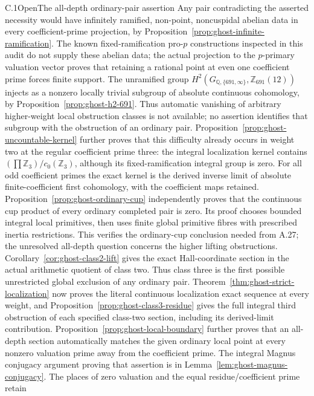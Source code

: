 \begin{result}{C.1}{Open}{The all-depth ordinary-pair assertion}
Any pair contradicting the asserted necessity would have
infinitely ramified, non-point, noncuspidal abelian data in
every coefficient-prime projection, by
Proposition~\ref{prop:ghost-infinite-ramification}. The
known fixed-ramification pro-\(p\) constructions inspected in
this audit do not supply these abelian data; the actual
projection to the \(p\)-primary valuation vector proves
that retaining a rational point at even one coefficient prime
forces finite support. The unramified group
\(H^2(G_{\mathbb Q,\{691,\infty\}},\mathbb Z_{691}(12))\)
injects as a nonzero locally trivial subgroup of absolute
continuous cohomology, by
Proposition~\ref{prop:ghost-h2-691}. Thus automatic vanishing
of arbitrary higher-weight local obstruction classes is not
available; no assertion identifies that subgroup with the
obstruction of an ordinary pair.
Proposition~\ref{prop:ghost-uncountable-kernel} further proves
that this difficulty already occurs in weight two at the
regular coefficient prime three: the integral localization
kernel contains \((\prod\mathbb Z_3)/c_0(\mathbb Z_3)\),
although its fixed-ramification integral group is zero.
For all odd coefficient primes the exact kernel is the
derived inverse limit of absolute finite-coefficient
first cohomology, with the coefficient maps retained.
Proposition~\ref{prop:ghost-ordinary-cup} independently
proves that the continuous cup product of every ordinary
completed pair is zero. Its proof chooses bounded integral
local primitives, then uses finite global primitive fibres
with prescribed inertia restrictions. This verifies the
ordinary-cup conclusion needed from A.27; the unresolved
all-depth question concerns the higher lifting obstructions.
Corollary~\ref{cor:ghost-class2-lift} gives the exact Hall-coordinate
section in the actual arithmetic quotient of class two. Thus
class three is the first possible unrestricted global exclusion
of any ordinary pair. Theorem~\ref{thm:ghost-strict-localization}
now proves the literal continuous localization exact sequence
at every weight, and Proposition~\ref{prop:ghost-class3-residue}
gives the full integral third obstruction of each specified
class-two section, including its derived-limit contribution.
Proposition~\ref{prop:ghost-local-boundary} further proves
that an all-depth section automatically matches the given
ordinary local point at every nonzero valuation prime away
from the coefficient prime. The integral Magnus conjugacy
argument proving that assertion is in
Lemma~\ref{lem:ghost-magnus-conjugacy}. The places of zero
valuation and the equal residue/coefficient prime retain

\end{result}
